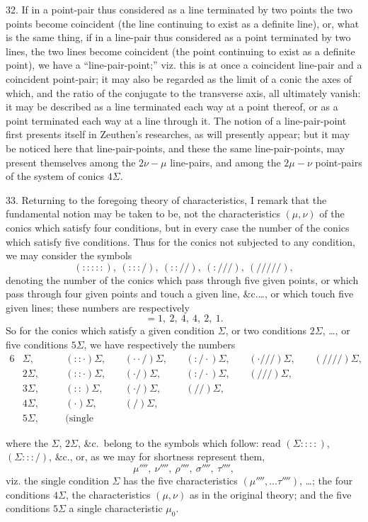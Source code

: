 \documentclass[12pt,a4paper]{article}
\begin{document}
32. If in a point-pair thus considered as a line terminated by two points the two points become coincident (the line continuing to exist as a definite line), or, what is the same thing, if in a line-pair thus considered as a point terminated by two lines, the two lines become coincident (the point continuing to exist as a definite point), we have a ``line-pair-point;'' viz. this is at once a coincident line-pair and a coincident point-pair; it may also be regarded as the limit of a conic the axes of which, and the ratio of the conjugate to the transverse axis, all ultimately vanish: it may be described as a line terminated each way at a point thereof, or as a point terminated each way at a line through it. The notion of a line-pair-point first presents itself in Zeuthen's researches, as will presently appear; but it may be noticed here that line-pair-points, and these the same line-pair-points, may present themselves among the $2\nu - \mu$ line-pairs, and among the $2\mu - \nu$ point-pairs of the system of conics $4\Sigma$.

33. Returning to the foregoing theory of characteristics, I remark that the fundamental notion may be taken to be, not the characteristics $(\mu, \nu)$ of the conics which satisfy four conditions, but in every case the number of the conics which satisfy five conditions. Thus for the conics not subjected to any condition, we may consider the symbols
\[
(:::::),\ (:::/),\ (:://),\ (:///),\ (/////),
\]
denoting the number of the conics which pass through five given points, or which pass through four given points and touch a given line, \&c.\dots, or which touch five given lines; these numbers are respectively
\[
=1,\ 2,\ 4,\ 4,\ 2,\ 1.
\]
So for the conics which satisfy a given condition $\Sigma$, or two conditions $2\Sigma$, \dots, or five conditions $5\Sigma$, we have respectively the numbers
\begin{alignat*}{6}
&\Sigma,\quad &&(::\cdot)\Sigma,\ &&(\cdot\cdot/)\Sigma,\ &&(:/\cdot)\Sigma,\ &&(\cdot///)\Sigma,\ &&(////)\Sigma,\\
&2\Sigma,\quad &&(::\cdot)\Sigma,\ &&(\cdot/)\Sigma,\ &&(:/\cdot)\Sigma,\ &&(///)\Sigma,\\
&3\Sigma,\quad &&(::)\Sigma,\ &&(\cdot/)\Sigma,\ &&(//)\Sigma,\\
&4\Sigma,\quad &&(\cdot)\Sigma,\ &&(/)\Sigma,\\
&5\Sigma,\quad &&\text{(single number).}
\end{alignat*}

\noindent where the $\Sigma$, $2\Sigma$, \&c.\ belong to the symbols which follow: read $(\Sigma ::::)$, $(\Sigma :::/)$, \&c., or, as we may for shortness represent them,
\[
\mu'''',\ \nu'''',\ \rho'''',\ \sigma'''',\ \tau'''',
\]
viz. the single condition $\Sigma$ has the five characteristics $(\mu'''', \dots \tau'''')$, \dots; the four conditions $4\Sigma$, the characteristics $(\mu, \nu)$ as in the original theory; and the five conditions $5\Sigma$ a single characteristic $\mu_0$.
\end{document}
